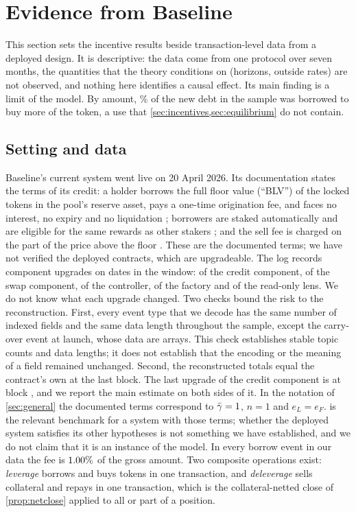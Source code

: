 \section{Evidence from Baseline}\label{sec:empirics}

This section sets the incentive results beside transaction-level data from a deployed design. It is descriptive: the data come from one protocol over seven months, the quantities that the theory conditions on (horizons, outside rates) are not observed, and nothing here identifies a causal effect. Its main finding is a limit of the model. By amount, \ELeverAmtPct\% of the new debt in the sample was borrowed to buy more of the token, a use that \cref{sec:incentives,sec:equilibrium} do not contain.

\subsection{Setting and data}

Baseline's current system went live on 20 April 2026. Its documentation states the terms of its credit: a holder borrows the full floor value (``BLV'') of the locked tokens in the pool's reserve asset, pays a one-time origination fee, and faces no interest, no expiry and no liquidation \citep{baselinedocs,baselinefaq}; borrowers are staked automatically and are eligible for the same rewards as other stakers \citep{baselinestake}; and the sell fee is charged on the part of the price above the floor \citep{baselinefees}. These are the documented terms; we have not verified the deployed contracts, which are upgradeable. The log records \EUpgrades{} component upgrades on \EUpDates{} dates in the window: \EUpCredit{} of the credit component, \EUpSwap{} of the swap component, \EUpController{} of the controller, \EUpFactory{} of the factory and \EUpLens{} of the read-only lens. We do not know what each upgrade changed. Two checks bound the risk to the reconstruction. First, every event type that we decode has the same number of indexed fields and the same data length throughout the sample, except the carry-over event at launch, whose data are arrays. This check establishes stable topic counts and data lengths; it does not establish that the encoding or the meaning of a field remained unchanged. Second, the reconstructed totals equal the contract's own at the last block. The last upgrade of the credit component is at block \EUpLastCredit, and we report the main estimate on both sides of it. In the notation of \cref{sec:general} the documented terms correspond to $\bar\gamma=1$, $n=1$ and $e_L=e_F$.  is the relevant benchmark for a system with those terms; whether the deployed system satisfies its other hypotheses is not something we have established, and we do not claim that it is an instance of the model. In every borrow event in our data the fee is $1.00\%$ of the gross amount. Two composite operations exist: \emph{leverage} borrows and buys tokens in one transaction, and \emph{deleverage} sells collateral and repays in one transaction, which is the collateral-netted close of \cref{prop:netclose} applied to all or part of a position.


